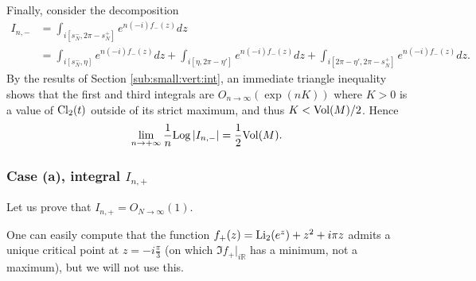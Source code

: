 \documentclass[11pt]{amsart}
\newcommand{\R}{\mathbb{R}}
\newcommand{\Log}{{\rm Log}}
\newcommand{\ra}{\rightarrow}
\begin{document}
{Finally, consider the decomposition
\begin{align*}
	I_{n,-} &=  \int_{i[s_N^-,2\pi-s_N^+]}  e^{n(-i) f_{-}(z)} dz\\
	&=
	\int_{i[ s_N^-,\eta ]}  e^{n(-i) f_{-}(z)} dz
	+\int_{i[\eta,2\pi-\eta']}  e^{n(-i) f_{-}(z)} dz
	+\int_{i[2\pi-\eta',2\pi- s_N^+]}  e^{n(-i) f_{-}(z)} dz.
\end{align*}
By  the results of Section \ref{sub:small:vert:int}, an immediate triangle inequality shows that
the first and third integrals are $O_{n\to\infty}(\exp(n K))$ where $K>0$ is a value of ${\rm Cl}_2(t)$ outside of its strict maximum, and thus $ K<{\rm Vol}(M)/2$. Hence
 $$\lim_{n\ra +\infty}  \dfrac{1}{n}\Log \left \vert I_{n,-} \right \vert 
= \dfrac{1}{2} {\rm Vol}(M).$$


\subsubsection{Case (a), integral $I_{n,+}$}\label{sec:case(a)In+}
Let us prove that $I_{n,+} = O_{N\ra \infty}(1)$.

One can easily compute that the function $f_+(z)=  {\rm Li}_2(e^{z})+z^2 +i\pi  z$ admits a unique critical point at $\textstyle z=-i \frac{\pi}{3}$ (on which $\Im f_+ |_{i\R}$  has a minimum, not a maximum), but we will not use this.


}
\end{document}
